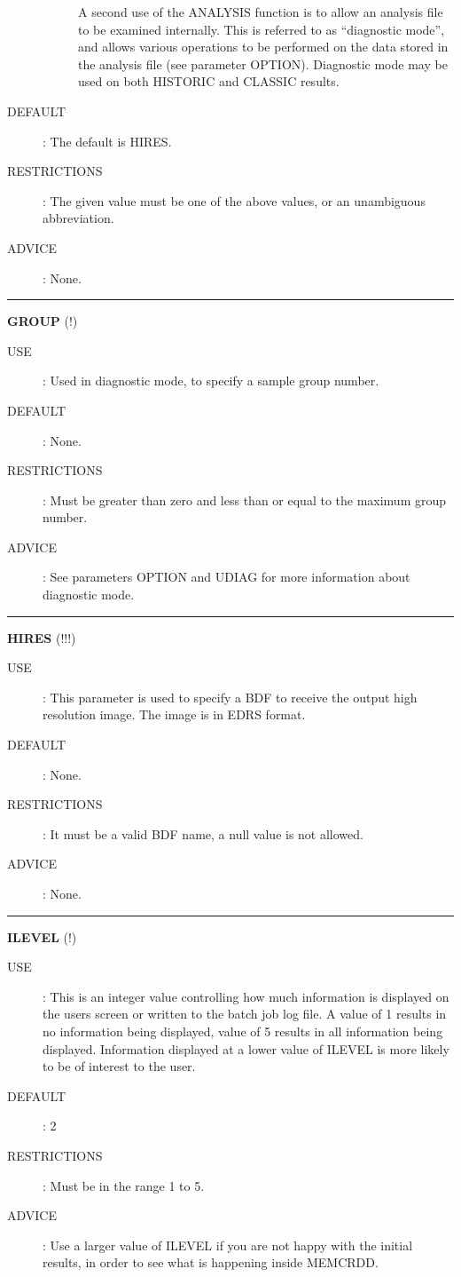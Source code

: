 \begin{description}
\begin{description}
A second use of the ANALYSIS function is to allow an analysis file to be
examined internally. This is referred to as ``diagnostic mode'', and allows
various operations to be performed on the data stored in the analysis file
(see parameter OPTION).
Diagnostic mode may be used on both HISTORIC and CLASSIC results.
\end{description}

\item [DEFAULT]:
The default is HIRES.
\item [RESTRICTIONS]:
The given value must be one of the above values, or an unambiguous abbreviation.
\item [ADVICE]:
None.
\end {description}

\rule{\textwidth}{0.3mm}
{\Large {\bf GROUP} (!)}
\begin{description}
\item [USE]:
Used in diagnostic mode, to specify a sample group number.
\item [DEFAULT]:
None.
\item [RESTRICTIONS]:
Must be greater than zero and less than or equal to the maximum group number.
\item [ADVICE]:
See parameters OPTION and UDIAG for more information about diagnostic mode.
\end {description}

\rule{\textwidth}{0.3mm}
{\Large {\bf HIRES} (!!!)}
\begin{description}
\item [USE]:
This parameter is used to specify a BDF to receive the output high resolution
image. The image is in EDRS format.
\item [DEFAULT]:
None.
\item [RESTRICTIONS]:
It must be a valid BDF name, a null value is not allowed.
\item [ADVICE]:
None.
\end {description}

\rule{\textwidth}{0.3mm}
{\Large {\bf ILEVEL} (!)}
\begin{description}
\item [USE]:
This is an integer value controlling how much information is displayed on the
users screen or written to the batch job log file. A value of 1 results in no
information being displayed, value of 5 results in all information being
displayed. Information displayed at a lower value of ILEVEL is more likely to
be of interest to the user.
\item [DEFAULT]:
2
\item [RESTRICTIONS]:
Must be in the range 1 to 5.
\item [ADVICE]:
Use a larger value of ILEVEL if you are not happy with the initial results, in
order to see what is happening inside MEMCRDD.
\end {description}

